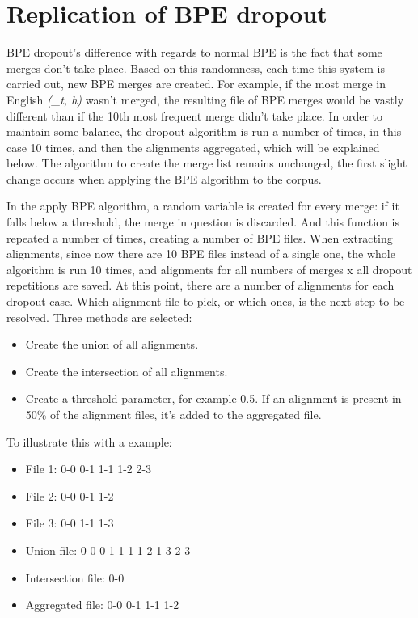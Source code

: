 \section{Replication of BPE dropout}\label{sec:replbpedrop}

BPE dropout's difference with regards to normal BPE is the fact that some merges don't take place. Based on this randomness, each time this system is carried out, new BPE merges are created. For example, if the most merge in English \emph{(\_t, h)} wasn't merged, the resulting file of BPE merges would be vastly different than if the 10th most frequent merge didn't take place. In order to maintain some balance, the dropout algorithm is run a number of times, in this case 10 times, and then the alignments aggregated, which will be explained below. The algorithm to create the merge list remains unchanged, the first slight change occurs when applying the BPE algorithm to the corpus.

In the apply BPE algorithm, a random variable is created for every merge: if it falls below a threshold, the merge in question is discarded. And this function is repeated a number of times, creating a number of BPE files. When extracting alignments, since now there are 10 BPE files instead of a single one, the whole algorithm is run 10 times, and alignments for all numbers of merges x all dropout repetitions are saved. At this point, there are a number of alignments for each dropout case. Which alignment file to pick, or which ones, is the next step to be resolved. Three methods are selected:

\begin{itemize}
	\item Create the union of all alignments.
	\item Create the intersection of all alignments.
	\item Create a threshold parameter, for example 0.5. If an alignment is present in 50\% of the alignment files, it's added to the aggregated file.
\end{itemize}

To illustrate this with a example:

\begin{itemize}
	\item File 1: 0-0 0-1 1-1 1-2 2-3
	\item File 2: 0-0 0-1 1-2
	\item File 3: 0-0 1-1 1-3
	\item Union file: 0-0 0-1 1-1 1-2 1-3 2-3
	\item Intersection file: 0-0
	\item Aggregated file: 0-0 0-1 1-1 1-2
\end{itemize}

